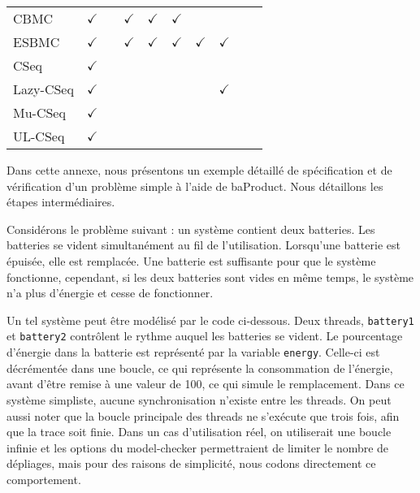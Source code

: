 \begin{landscape}
\begin{table}[ht]
\begin{tabular}{|l|c|c|c|c|c|c|c|c|c|}
CBMC       & $\checkmark$ &              & $\checkmark$ & $\checkmark$ & $\checkmark$ &              &              &              &                \\
ESBMC      & $\checkmark$ &              & $\checkmark$ & $\checkmark$ & $\checkmark$ & $\checkmark$ & $\checkmark$ &              &                \\
CSeq       & $\checkmark$ &              &              &              &              &              &              &              &                \\
Lazy-CSeq  & $\checkmark$ &              &              &              &              &              & $\checkmark$ &              &                \\
Mu-CSeq    & $\checkmark$ &              &              &              &              &              &              &              &                \\
UL-CSeq    & $\checkmark$ &              &              &              &              &              &              &              &                \\ \hline
\end{tabular}
\label{tab:prop_type_table}
\end{table}

\end{landscape}




Dans cette annexe, nous présentons un exemple détaillé de spécification et de
vérification d'un problème simple à l'aide de baProduct. Nous détaillons les
étapes intermédiaires.

Considérons le problème suivant : un système contient deux batteries. Les
batteries se vident simultanément au fil de l'utilisation. Lorsqu'une batterie
est épuisée, elle est remplacée. Une batterie est suffisante pour que le système
fonctionne, cependant, si les deux batteries sont vides en même temps, le
système n'a plus d'énergie et cesse de fonctionner.

Un tel système peut être modélisé par le code ci-dessous. Deux threads,
\texttt{battery1} et \texttt{battery2} contrôlent le rythme auquel les
batteries se vident. Le pourcentage d'énergie dans la batterie est représenté
par la variable \texttt{energy}. Celle-ci est décrémentée dans une
boucle, ce qui représente la consommation de l'énergie, avant d'être remise à
une valeur de 100, ce qui simule le remplacement. Dans ce système simpliste,
aucune synchronisation n'existe entre les threads.
On peut aussi noter que la boucle principale des threads ne s'exécute que trois
fois, afin que la trace soit finie. Dans un cas d'utilisation réel, on
utiliserait une boucle infinie et les options du model-checker permettraient de
limiter le nombre de dépliages, mais pour des raisons de simplicité, nous codons
directement ce comportement.

